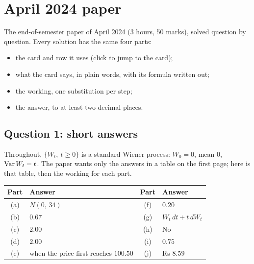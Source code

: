\chapter{April 2024 paper}
\label{ch:paper-2024-apr}

\begin{whatfor}
The end-of-semester paper of April 2024 (3 hours, 50 marks), solved question by question. Every solution has the same four parts:
\begin{itemize}
\item the card and row it uses (click to jump to the card);
\item what the card says, in plain words, with its formula written out;
\item the working, one substitution per step;
\item the answer, to at least two decimal places.
\end{itemize}
\end{whatfor}

\section{Question 1: short answers}

Throughout, $\{W_t,\ t\ge0\}$ is a standard Wiener process: $W_0=0$, mean $0$, $\operatorname{Var} W_t=t$. The paper wants only the answers in a table on the first page; here is that table, then the working for each part.

\begin{center}
\begin{tabular}{@{}cl@{\qquad}cl@{}}
\toprule
Part & Answer & Part & Answer\\
\midrule
(a) & $N(0,\,34)$ & (f) & $0.20$\\
(b) & $0.67$ & (g) & $W_t\,dt+t\,dW_t$\\
(c) & $2.00$ & (h) & No\\
(d) & $2.00$ & (i) & $0.75$\\
(e) & when the price first reaches $100.50$ & (j) & Rs $8.59$\\
\bottomrule
\end{tabular}
\end{center}

